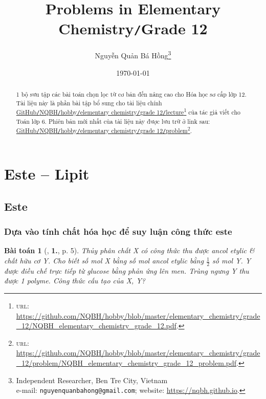 \documentclass{article}
\title{Problems in Elementary Chemistry\texttt{/}Grade 12}
\author{Nguyễn Quản Bá Hồng\footnote{Independent Researcher, Ben Tre City, Vietnam\\e-mail: \texttt{nguyenquanbahong@gmail.com}; website: \url{https://nqbh.github.io}.}}
\date{\today}
\numberwithin{equation}{section}
\newtheorem{baitoan}{Bài toán}[section]
\begin{document}
\maketitle
\begin{abstract}
	1 bộ sưu tập các bài toán chọn lọc từ cơ bản đến nâng cao cho Hóa học sơ cấp lớp 12. Tài liệu này là phần bài tập bổ sung cho tài liệu chính \href{https://github.com/NQBH/hobby/blob/master/elementary_chemistry/grade_12/NQBH_elementary_chemistry_grade_12.pdf}{GitHub\texttt{/}NQBH\texttt{/}hobby\texttt{/}elementary chemistry\texttt{/}grade 12\texttt{/}lecture}\footnote{\textsc{url}: \url{https://github.com/NQBH/hobby/blob/master/elementary_chemistry/grade_12/NQBH_elementary_chemistry_grade_12.pdf}.} của tác giả viết cho Toán lớp 6. Phiên bản mới nhất của tài liệu này được lưu trữ ở link sau: \href{https://github.com/NQBH/hobby/blob/master/elementary_chemistry/grade_12/problem/NQBH_elementary_chemistry_grade_12_problem.pdf}{GitHub\texttt{/}NQBH\texttt{/}hobby\texttt{/}elementary chemistry\texttt{/}grade 12\texttt{/}problem}\footnote{\textsc{url}: \url{https://github.com/NQBH/hobby/blob/master/elementary_chemistry/grade_12/problem/NQBH_elementary_chemistry_grade_12_problem.pdf}.}.
\end{abstract}
\tableofcontents
\newpage


\section{Este -- Lipit}

\subsection{Este}

\subsubsection{Dựa vào tính chất hóa học để suy luận công thức este}

\begin{baitoan}[\cite{An2008}, \textbf{1.}, p. 5]
	Thủy phân chất X có công thức  thu được ancol etylic \& chất hữu cơ Y. Cho biết số mol X bằng số mol ancol etylic bằng $\frac{1}{2}$ số mol Y. Y được điều chế trực tiếp từ glucose bằng phản ứng lên men. Trùng ngưng Y thu được 1 polyme. Công thức cấu tạo của X, Y?
\end{baitoan}
\end{document}
